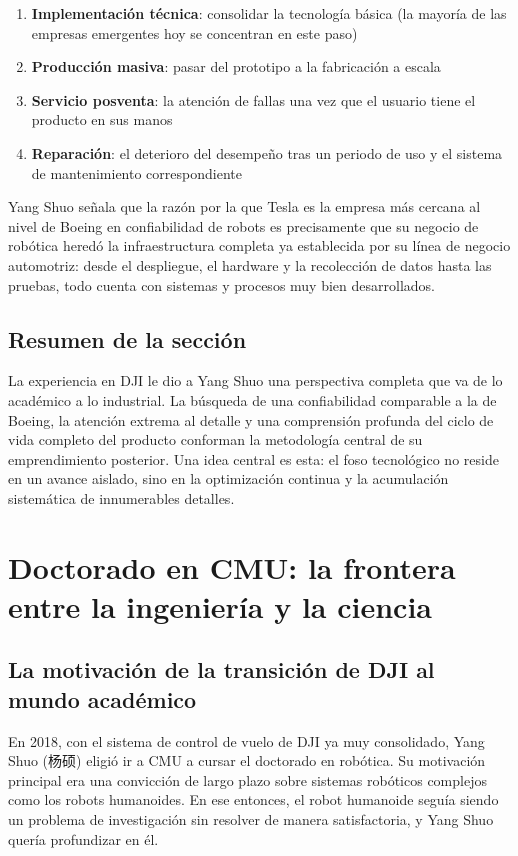 \documentclass[a4paper]{article}
\begin{document}
\begin{enumerate}
    \item \textbf{Implementación técnica}: consolidar la tecnología básica (la mayoría de las empresas emergentes hoy se concentran en este paso)
    \item \textbf{Producción masiva}: pasar del prototipo a la fabricación a escala
    \item \textbf{Servicio posventa}: la atención de fallas una vez que el usuario tiene el producto en sus manos
    \item \textbf{Reparación}: el deterioro del desempeño tras un periodo de uso y el sistema de mantenimiento correspondiente
\end{enumerate}

Yang Shuo señala que la razón por la que Tesla es la empresa más cercana al nivel de Boeing en confiabilidad de robots es precisamente que su negocio de robótica heredó la infraestructura completa ya establecida por su línea de negocio automotriz: desde el despliegue, el hardware y la recolección de datos hasta las pruebas, todo cuenta con sistemas y procesos muy bien desarrollados.

\subsection{Resumen de la sección}

La experiencia en DJI le dio a Yang Shuo una perspectiva completa que va de lo académico a lo industrial. La búsqueda de una confiabilidad comparable a la de Boeing, la atención extrema al detalle y una comprensión profunda del ciclo de vida completo del producto conforman la metodología central de su emprendimiento posterior. Una idea central es esta: el foso tecnológico no reside en un avance aislado, sino en la optimización continua y la acumulación sistemática de innumerables detalles.
\section{Doctorado en CMU: la frontera entre la ingeniería y la ciencia}

\subsection{La motivación de la transición de DJI al mundo académico}

En 2018, con el sistema de control de vuelo de DJI ya muy consolidado, Yang Shuo (杨硕) eligió ir a CMU a cursar el doctorado en robótica. Su motivación principal era una convicción de largo plazo sobre sistemas robóticos complejos como los robots humanoides. En ese entonces, el robot humanoide seguía siendo un problema de investigación sin resolver de manera satisfactoria, y Yang Shuo quería profundizar en él.
\end{document}
